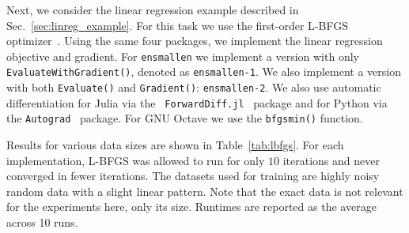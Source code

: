 \documentclass{article}
\begin{document}
Next, we consider the linear regression example described in
Sec.~\ref{sec:linreg_example}.  For this task we use the first-order L-BFGS
optimizer~\cite{zhu1997algorithm}.  Using the same four packages, we implement
the linear regression objective and gradient.  For \texttt{\small ensmallen} we
implement a version with only \texttt{\small EvaluateWithGradient()},
denoted as \texttt{\small ensmallen-1}.  We also implement a version with both
\texttt{\small Evaluate()} and \texttt{\small Gradient()}: \texttt{\small ensmallen-2}.
We also use automatic differentiation for Julia via the \texttt{\small
ForwardDiff.jl}~\cite{RevelsLubinPapamarkou2016} package and for Python via the
\texttt{\small Autograd}~\cite{maclaurin2015autograd}
package.  For GNU Octave we use the \texttt{\small bfgsmin()} function.



Results for various data sizes are shown in Table~\ref{tab:lbfgs}.  For each
implementation, L-BFGS was allowed to run for only $10$ iterations and never
converged in fewer iterations.  The datasets used for training are highly noisy random
data with a slight linear pattern. Note that the exact data is not relevant
for the experiments here, only its size.  Runtimes are reported as the
average across 10 runs.
\end{document}
